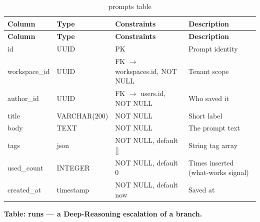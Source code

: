 \documentclass[12pt,a4paper]{report}
\begin{document}
\begingroup
\setlength{\parskip}{0pt}\renewcommand{\arraystretch}{1.32}\footnotesize
\begin{xltabular}{\textwidth}{>{\hsize\raggedright\arraybackslash}X >{\hsize\raggedright\arraybackslash}X >{\hsize\raggedright\arraybackslash}X >{\hsize\raggedright\arraybackslash}X}
\caption{prompts table}\\
\toprule
\textbf{Column} & \textbf{Type} & \textbf{Constraints} & \textbf{Description} \\
\midrule\endfirsthead
\toprule
\textbf{Column} & \textbf{Type} & \textbf{Constraints} & \textbf{Description} \\
\midrule\endhead
\bottomrule\endfoot
id & UUID & PK & Prompt identity \\
workspace\_id & UUID & FK $\rightarrow$ workspaces.id, NOT NULL & Tenant scope \\
author\_id & UUID & FK $\rightarrow$ users.id, NOT NULL & Who saved it \\
title & VARCHAR(200) & NOT NULL & Short label \\
body & TEXT & NOT NULL & The prompt text \\
tags & json & NOT NULL, default [] & String tag array \\
used\_count & INTEGER & NOT NULL, default 0 & Times inserted (what-works signal) \\
created\_at & timestamp & NOT NULL, default now & Saved at \\
\end{xltabular}
\endgroup

\noindent\textbf{Table: runs --- a Deep-Reasoning escalation of a branch.}
\end{document}
